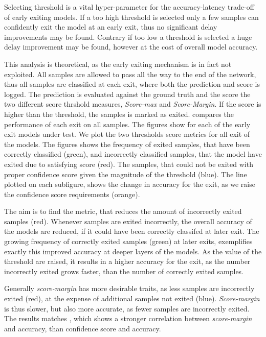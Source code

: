 Selecting threshold is a vital hyper-parameter for the accuracy-latency trade-off of early exiting models. If a too high threshold is selected only a few samples can confidently exit the model at an early exit, thus no significant delay improvements may be found. Contrary if too low a threshold is selected a huge delay improvement may be found, however at the cost of overall model accuracy. 

This analysis is theoretical, as the early exiting mechanism is in fact not exploited. All samples are allowed to pass all the way to the end of the network, thus all samples are classified at each exit, where both the prediction and score is logged. The prediction is evaluated against the ground truth and the score the two different score thrshold measures, \emph{Score-max} and \emph{Score-Margin}. If the score is higher than the threshold, the samples is marked as exited.  compares the performance of each exit on all samples. The figures show for each of the early exit models under test. We plot the two thresholds score metrics for all exit of the models. The figures shows the frequency of exited samples, that have been correctly classified ({\color{sns-green}green}), and incorrectly classified samples, that the model have exited due to satisfying score ({\color{sns-red}red}). The samples, that could not be exited with proper confidence score given the magnitude of the threshold ({\color{sns-blue}blue}). The line plotted on each subfigure, shows the change in accuracy for the exit, as we raise the confidence score requirements ({\color{sns-orange}orange}).  

The aim is to find the metric, that reduces the amount of incorrectly exited samples ({\color{sns-red}red}). Whenever samples are exited incorrectly, the overall accuracy of the models are reduced, if it could have been correctly classifed at later exit. The growing frequency of correctly exited samples ({\color{sns-green}green}) at later exits, exemplifies exactly this improved accuracy at deeper layers of the models. As the value of the threshold are raised, it results in a higher accuracy for the exit, as the number incorrectly exited grows faster, than the number of correctly exited samples. 

Generally \emph{score-margin} has more desirable traits, as less samples are incorrectly exited ({\color{sns-red}red}), at the expense of additional samples not exited ({\color{sns-blue}blue}). \emph{Score-margin} is thus slower, but also more accurate, as fewer samples are incorrectly exited. The results matches \cite{park_big/little_2015}, which shows a stronger correlation between \emph{score-margin} and accuracy, than confidence score and accuracy.

